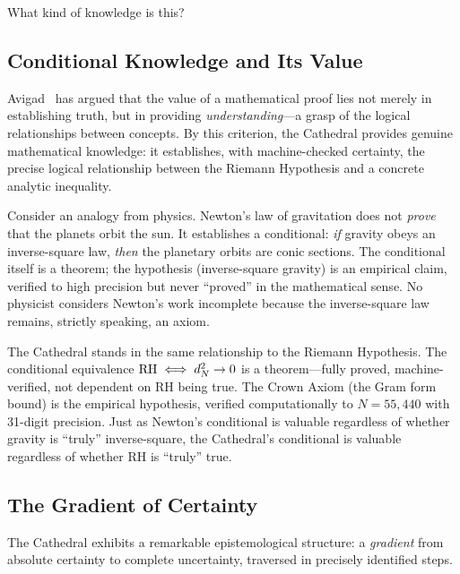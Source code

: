 \noindent What kind of knowledge is this?

\subsection{Conditional Knowledge and Its Value}

Avigad~\cite{avigad2006} has argued that the value of a
mathematical proof lies not merely in establishing truth, but in
providing \emph{understanding}---a grasp of the logical
relationships between concepts. By this criterion, the Cathedral
provides genuine mathematical knowledge: it establishes, with
machine-checked certainty, the precise logical relationship between
the Riemann Hypothesis and a concrete analytic inequality.

Consider an analogy from physics. Newton's law of gravitation
does not \emph{prove} that the planets orbit the sun. It
establishes a conditional: \emph{if} gravity obeys an inverse-square
law, \emph{then} the planetary orbits are conic sections. The
conditional itself is a theorem; the hypothesis (inverse-square
gravity) is an empirical claim, verified to high precision but
never ``proved'' in the mathematical sense. No physicist considers
Newton's work incomplete because the inverse-square law remains,
strictly speaking, an axiom.

The Cathedral stands in the same relationship to the Riemann
Hypothesis. The conditional equivalence $\mathrm{RH} \iff d_N^2 \to 0$ is
a theorem---fully proved, machine-verified, not dependent on RH
being true. The Crown Axiom (the Gram form bound) is the empirical
hypothesis, verified computationally to $N = 55{,}440$ with
31-digit precision. Just as Newton's conditional is valuable
regardless of whether gravity is ``truly'' inverse-square, the
Cathedral's conditional is valuable regardless of whether RH
is ``truly'' true.

\subsection{The Gradient of Certainty}

The Cathedral exhibits a remarkable epistemological structure: a
\emph{gradient} from absolute certainty to complete uncertainty,
traversed in precisely identified steps.

